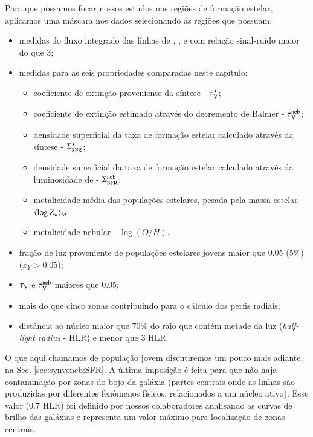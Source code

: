 Para que possamos focar nossos estudos nas regiões de formação estelar, aplicamos uma máscara nos
dados selecionando as regiões que possuam:
\begin{itemize}
  \setlength\itemsep{0.2cm}
  \item medidas do fluxo integrado das linhas de \Hbeta, \oIII, \Halpha e \nII com relação
sinal-ruído maior do que 3;
  \item medidas para as seis propriedades comparadas neste capítulo:
  \begin{itemize}
    \item coeficiente de extinção proveniente da síntese - $\tau_{\mathrm{V}}^\star$;
    \item coeficiente de extinção estimado através do decremento de Balmer - $\tau_{\mathrm{V}}^{\mathrm{neb}}$;
    \item densidade superficial da taxa de formação estelar calculado através da síntese -
$\Sigma_{\mathrm{SFR}}^\star$;
	\item densidade superficial da taxa de formação estelar calculado através da luminosidade de
\Halpha - $\Sigma_{\mathrm{SFR}}^{\mathrm{neb}}$;
	\item metalicidade média das populações estelares, pesada pela massa estelar - $\meanM{\log
Z_\star}$;
	\item metalicidade nebular - $\log(O/H)$.
  \end{itemize}
  \item fração de luz proveniente de populações estelares jovens maior que 0.05 (5\%) ($x_Y >
0.05$);
  \item $\tau_{\mathrm{V}}$ e $\tau_{\mathrm{V}}^{\mathrm{neb}}$ maiores que 0.05;
  \item mais do que cinco zonas contribuindo para o cálculo dos perfis radiais;
  \item distância ao núcleo maior que 70\% do raio que contém metade da luz ({\em half-light
 radius} - HLR) e menor que 3 HLR.
\end{itemize}
\noindent O que aqui chamamos de população jovem discutiremos um pouco mais adiante, na Sec.
\ref{sec:synvsneb:SFR}. A última imposição é feita para que não haja contaminação por zonas
do bojo da galáxia (partes centrais onde as linhas são produzidas por diferentes fenômenos físicos,
relacionados a um núcleo ativo). Esse valor (0.7 HLR) foi definido por nossos colaboradores
analisando as curvas de brilho das galáxias e representa um valor máximo para localização de zonas
centrais.


